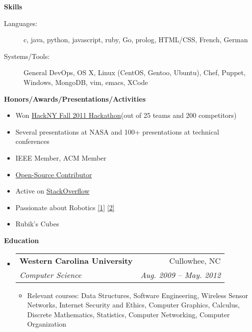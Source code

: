 \documentclass[letterpaper,8pt]{article}
\makeatletter
\newcommand{\resitem}[1]{\item #1 \vspace{-2pt}}
\newcommand{\resheading}[1]{{\large \colorbox{mygrey}{\begin{minipage}{\textwidth}{\textbf{#1 \vphantom{p\^{E}}}}\end{minipage}}}}
\newcommand{\ressubheading}[4]{
\begin{tabular*}{2.0in}{l@{\extracolsep{\fill}}r}
		\textbf{#1} & #2 \\
		\textit{#3} & \textit{#4} \\
\end{tabular*}\vspace{-6pt}}
\makeatother
\begin{document}
\resheading{Skills}
\begin{description}
\item[Languages:]
c, java, python, javascript, ruby, Go, prolog, HTML/CSS, French, German
\item[Systems/Tools:]
General DevOps, OS X, Linux (CentOS, Gentoo, Ubuntu), Chef, Puppet, Windows, MongoDB, vim, emacs, XCode
\end{description}

\resheading{Honors/Awards/Presentations/Activities}
\begin{itemize}
   \resitem{Won \href{http://www.youtube.com/watch?v=ga6RPRAFRUY}{HackNY Fall 2011 Hackathon}(out of 25 teams and 200 competitors)}
   \resitem{Several presentations at NASA and 100+ presentations at technical conferences}
   \resitem{IEEE Member, ACM Member}
   \resitem{\href{https://github.com/ranman}{Open-Source Contributor}}
   \resitem{Active on \href{http://stackoverflow.com/users/240004/ranman}{StackOverflow}}
   \resitem{Passionate about Robotics
      \href{http://robotics.punahou.edu/}{[1]}
      \href{http://irg.arc.nasa.gov}{[2]}}
   \resitem{Rubik's Cubes}
\end{itemize}
\resheading{Education}
\begin{itemize}
\item
   \ressubheading{Western Carolina University}{Cullowhee, NC}{Computer Science}{Aug. 2009 -- May. 2012}
   \begin{itemize}
      \resitem{Relevant courses: Data Structures, Software Engineering, Wireless Sensor Networks, Internet Security and Ethics, Computer Graphics, Calculus, Discrete Mathematics, Statistics, Computer Networking, Computer Organization}
   \end{itemize}
\end{itemize}
\end{document}
